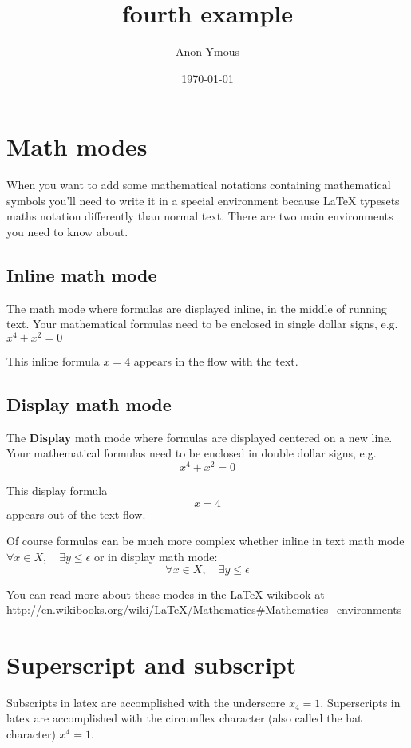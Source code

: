 \documentclass[a4paper]{article}
\author{Anon Ymous}
\date{\today}
\title{fourth example}
\begin{document}
\maketitle

\tableofcontents

\section{Math modes}

When you want to add some mathematical notations containing mathematical symbols
you'll need to write it in a special environment because LaTeX typesets maths
notation differently than normal text. There are two main environments you need
to know about.


\subsection{Inline math mode}

The math mode where formulas are displayed inline, in the middle of running
text. Your mathematical formulas need to be enclosed in single dollar
signs, e.g. $x^4 + x^2 = 0$

This inline formula $x = 4$ appears in the flow with the text.


\subsection{Display math mode}

The \textbf{Display} math mode where formulas are displayed centered on a new
line. Your mathematical formulas need to be enclosed in double dollar
signs, e.g. $$x^4 + x^2 = 0$$

This display formula $$x = 4$$ appears out of the text flow.

Of course formulas can be much more complex whether inline in text math mode
$\forall x \in X, \quad \exists y \leq \epsilon$ or in display math mode:
$$\forall x \in X, \quad \exists y \leq \epsilon$$

You can read more about these modes in the LaTeX wikibook at
\url{http://en.wikibooks.org/wiki/LaTeX/Mathematics#Mathematics_environments}


\section{Superscript and subscript}

Subscripts in latex are accomplished with the underscore $x_4 = 1$.
Superscripts in latex are accomplished with the circumflex character
(also called the hat character) $x^4 = 1$.
\end{document}
